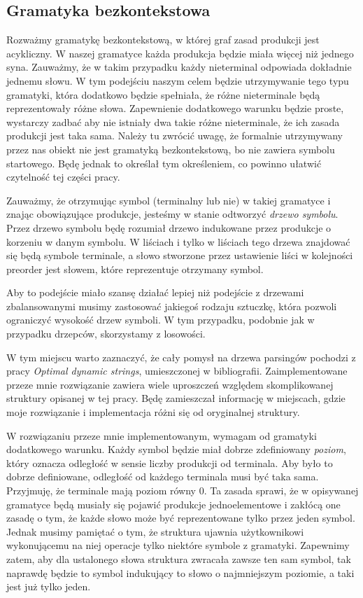 \documentclass[declaration,shortabstract]{iithesis}
\theoremstyle{definition} \newtheorem{definition}{Definicja}[chapter]
\theoremstyle{remark} \newtheorem{remark}[definition]{Obserwacja}
\theoremstyle{plain} \newtheorem{theorem}[definition]{Twierdzenie}
\theoremstyle{remark} \newtheorem{example}{Przykład}[definition]
\theoremstyle{plain} \newtheorem{lemma}[definition]{Lemat}
\begin{document}
\subsection{Gramatyka bezkontekstowa}

Rozważmy gramatykę bezkontekstową, w której graf zasad produkcji jest acykliczny. W naszej gramatyce każda produkcja będzie miała więcej niż jednego syna. Zauważmy, że w takim przypadku każdy nieterminal odpowiada dokładnie jednemu słowu. W tym podejściu naszym celem będzie utrzymywanie tego typu gramatyki, która dodatkowo będzie spełniała, że różne nieterminale będą reprezentowały różne słowa. Zapewnienie dodatkowego warunku będzie proste, wystarczy zadbać aby nie istniały dwa takie różne nieterminale, że ich zasada produkcji jest taka sama. Należy tu zwrócić uwagę, że formalnie utrzymywany przez nas obiekt nie jest gramatyką bezkontekstową, bo nie zawiera symbolu startowego. Będę jednak to określał tym określeniem, co powinno ułatwić czytelność tej części pracy.

Zauważmy, że otrzymując symbol (terminalny lub nie) w takiej gramatyce i znając obowiązujące produkcje, jesteśmy w stanie odtworzyć \textit{drzewo symbolu}. Przez drzewo symbolu będę rozumiał drzewo indukowane przez produkcje o korzeniu w danym symbolu. W liściach i tylko w liściach tego drzewa znajdować się będą symbole terminale, a słowo stworzone przez ustawienie liści w kolejności preorder jest słowem, które reprezentuje otrzymany symbol.

Aby to podejście miało szansę działać lepiej niż podejście z drzewami zbalansowanymi musimy zastosować jakiegoś rodzaju sztuczkę, która pozwoli ograniczyć wysokość drzew symboli. W tym przypadku, podobnie jak w przypadku drzepców, skorzystamy z losowości.

W tym miejscu warto zaznaczyć, że cały pomysł na drzewa parsingów pochodzi z pracy \textit{Optimal dynamic strings}, umieszczonej w bibliografii. Zaimplementowane przeze mnie rozwiązanie zawiera wiele uproszczeń względem skomplikowanej struktury opisanej w tej pracy. Będę zamieszczał informację w miejscach, gdzie moje rozwiązanie i implementacja różni się od oryginalnej struktury.

W rozwiązaniu przeze mnie implementowanym, wymagam od gramatyki dodatkowego warunku. Każdy symbol będzie miał dobrze zdefiniowany \textit{poziom}, który oznacza odległość w sensie liczby produkcji od terminala. Aby było to dobrze definiowane, odległość od każdego terminala musi być taka sama. Przyjmuję, że terminale mają poziom równy $0$. Ta zasada sprawi, że w opisywanej gramatyce będą musiały się pojawić produkcje jednoelementowe i zakłócą one zasadę o tym, że każde słowo może być reprezentowane tylko przez jeden symbol. Jednak musimy pamiętać o tym, że struktura ujawnia użytkownikowi wykonującemu na niej operacje tylko niektóre symbole z gramatyki. Zapewnimy zatem, aby dla ustalonego słowa struktura zwracała zawsze ten sam symbol, tak naprawdę będzie to symbol indukujący to słowo o najmniejszym poziomie, a taki jest już tylko jeden.
\end{document}
